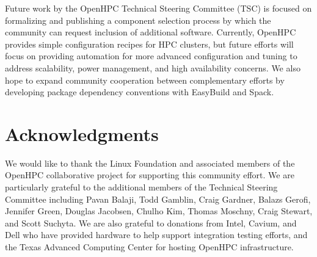 \documentclass{sig-alternate-05-2015}
\begin{document}
Future work by the OpenHPC Technical Steering Committee (TSC) is focused on
formalizing and publishing a component selection process by which the community
can request inclusion of additional software. Currently, OpenHPC provides simple
configuration recipes for HPC clusters, but future efforts will focus on 
providing automation for more advanced configuration and tuning to address
scalability, power management, and high availability concerns. We also hope to
expand community cooperation between complementary efforts by 
developing package dependency conventions with EasyBuild and Spack.

\section{Acknowledgments}

We would like to thank the Linux Foundation and associated members of the
OpenHPC collaborative project for supporting this community effort.  We are
particularly grateful to the additional members of the Technical Steering
Committee including Pavan Balaji, Todd Gamblin, Craig Gardner, Balazs Gerofi,
Jennifer Green, Douglas Jacobsen, Chulho Kim, Thomas Moschny, Craig Stewart,
and Scott Suchyta.
We are also grateful to donations
from Intel, Cavium, and Dell who have provided hardware to help support integration testing
efforts, and the Texas Advanced Computing Center for hosting OpenHPC infrastructure.




\end{document}
